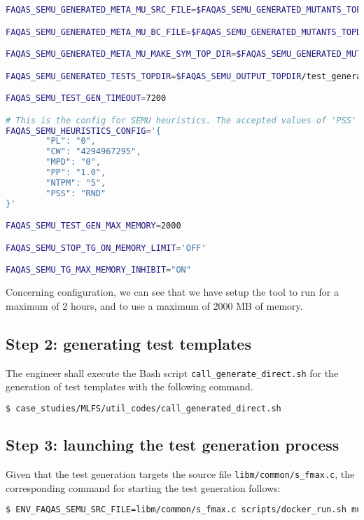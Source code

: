 \begin{lstlisting}[language=bash,label=listing:MLFS:conf,caption=faqas\_semus\_conf.sh file for MLFS case study.]
FAQAS_SEMU_GENERATED_META_MU_SRC_FILE=$FAQAS_SEMU_GENERATED_MUTANTS_TOPDIR/"${ENV_FAQAS_SEMU_SRC_FILE%.c}".MetaMu.c

FAQAS_SEMU_GENERATED_META_MU_BC_FILE=$FAQAS_SEMU_GENERATED_MUTANTS_TOPDIR/"${ENV_FAQAS_SEMU_SRC_FILE%.c}".MetaMu.bc

FAQAS_SEMU_GENERATED_META_MU_MAKE_SYM_TOP_DIR=$FAQAS_SEMU_GENERATED_MUTANTS_TOPDIR/"MakeSym-TestGen-Input"

FAQAS_SEMU_GENERATED_TESTS_TOPDIR=$FAQAS_SEMU_OUTPUT_TOPDIR/test_generation

FAQAS_SEMU_TEST_GEN_TIMEOUT=7200

# This is the config for SEMU heuristics. The accepted values of 'PSS' are 'RND' for random and 'MDO' for minimum distance to output
FAQAS_SEMU_HEURISTICS_CONFIG='{
        "PL": "0",
        "CW": "4294967295",
        "MPD": "0",
        "PP": "1.0",
        "NTPM": "5",
        "PSS": "RND"
}'

FAQAS_SEMU_TEST_GEN_MAX_MEMORY=2000

FAQAS_SEMU_STOP_TG_ON_MEMORY_LIMIT='OFF'

FAQAS_SEMU_TG_MAX_MEMORY_INHIBIT="ON"

\end{lstlisting}

Concerning \SEMU configuration, we can see that we have setup the tool to run for a maximum of 2 hours, and to use a maximum of 2000 MB of memory.

\subsection{Step 2: generating test templates}

The engineer shall execute the Bash script \texttt{call\_generate\_direct.sh} for the generation of test templates with the following command.

\begin{lstlisting}[language=bash]
$ case_studies/MLFS/util_codes/call_generated_direct.sh
\end{lstlisting}

\subsection{Step 3: launching the test generation process}

Given that the test generation targets the source file \texttt{libm/common/s\_fmax.c}, the corresponding command for starting the test generation follows:

\begin{lstlisting}[language=bash]
 $ ENV_FAQAS_SEMU_SRC_FILE=libm/common/s_fmax.c scripts/docker_run.sh mutation WORKSPACE/DOWNLOADED/live_mutants WORKSPACE/OUTPUT/live_mutants_output
\end{lstlisting}


